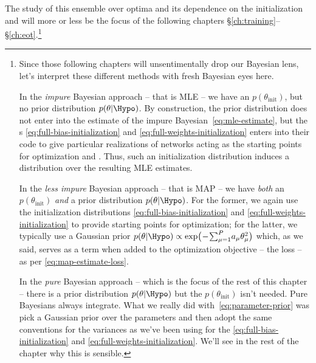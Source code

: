 The study of this ensemble over optima and its dependence on the initialization and  will more or less be the focus of the following chapters \S\ref{ch:training}--\S\ref{ch:eot}.\footnote{Since those following chapters will unsentimentally drop our Bayesian lens, let's interpret these different methods with fresh Bayesian eyes here.\label{foot:foretelling-GD}

In the \emph{impure} Bayesian approach -- that is MLE -- we have an  $p(\theta_{\text{init}})$, but no prior distribution $p(\theta\vert\Hypo)$. By construction, the prior distribution does not enter into the estimate of the impure Bayesian~\eqref{eq:mle-estimate}, but the s \eqref{eq:full-bias-initialization} and \eqref{eq:full-weights-initialization} enters into their code to give particular realizations of networks acting as the starting points for optimization and . Thus, such an initialization distribution induces a distribution over the resulting MLE estimates.

In the \emph{less impure} Bayesian approach -- that is MAP -- we have \emph{both} an  $p(\theta_{\text{init}})$ \emph{and}  a prior distribution $p(\theta\vert\Hypo)$. For the former, we again use the initialization distributions \eqref{eq:full-bias-initialization} and \eqref{eq:full-weights-initialization} to provide starting points for optimization; for the latter, we typically use a Gaussian prior $p(\theta\vert\Hypo)\propto\exp\!\big(\!-\!\sum_{\mu=1}^P\! a_{\mu}\theta_\mu^2\big)$ which, as we said, serves as a  term when added to the optimization objective -- the loss -- as per \eqref{eq:map-estimate-loss}.

In the \emph{pure} Bayesian approach -- which is the focus of the rest of this chapter -- there is a prior distribution $p(\theta\vert\Hypo)$ but the  $p(\theta_{\text{init}})$ isn't needed.
Pure Bayesians always integrate. What we really did with~\eqref{eq:parameter-prior} was pick a Gaussian prior over the parameters and then adopt the same conventions for the variances as we've been using for the  \eqref{eq:full-bias-initialization} and \eqref{eq:full-weights-initialization}. %
We'll see in the rest of the chapter why this is sensible.
} 




























